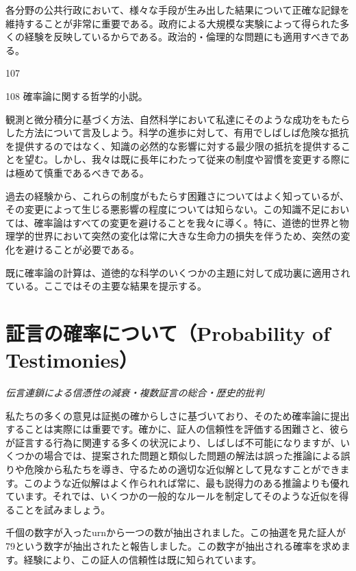 \documentclass[a4paper,11pt,openany]{ltjsbook}
\begin{document}
各分野の公共行政において、様々な手段が生み出した結果について正確な記録を維持することが非常に重要である。政府による大規模な実験によって得られた多くの経験を反映しているからである。政治的・倫理的な問題にも適用すべきである。

107

108      確率論に関する哲学的小説。

観測と微分積分に基づく方法、自然科学において私達にそのような成功をもたらした方法について言及しよう。科学の進歩に対して、有用でしばしば危険な抵抗を提供するのではなく、知識の必然的な影響に対する最少限の抵抗を提供することを望む。しかし、我々は既に長年にわたって従来の制度や習慣を変更する際には極めて慎重であるべきである。

過去の経験から、これらの制度がもたらす困難さについてはよく知っているが、その変更によって生じる悪影響の程度については知らない。この知識不足においては、確率論はすべての変更を避けることを我々に導く。特に、道徳的世界と物理学的世界において突然の変化は常に大きな生命力の損失を伴うため、突然の変化を避けることが必要である。

既に確率論の計算は、道徳的な科学のいくつかの主題に対して成功裏に適用されている。ここではその主要な結果を提示する。

\newpage

\chapter{証言の確率について（Probability of Testimonies）}
\label{ch:xi}

\begin{center}
\large\textit{伝言連鎖による信憑性の減衰・複数証言の総合・歴史的批判}
\end{center}
\vspace{4mm}

私たちの多くの意見は証拠の確からしさに基づいており、そのため確率論に提出することは実際には重要です。確かに、証人の信頼性を評価する困難さと、彼らが証言する行為に関連する多くの状況により、しばしば不可能になりますが、いくつかの場合では、提案された問題と類似した問題の解法は誤った推論による誤りや危険から私たちを導き、守るための適切な近似解として見なすことができます。このような近似解はよく作られれば常に、最も説得力のある推論よりも優れています。それでは、いくつかの一般的なルールを制定してそのような近似を得ることを試みましょう。

千個の数字が入ったurnから一つの数が抽出されました。この抽選を見た証人が79という数字が抽出されたと報告しました。この数字が抽出される確率を求めます。経験により、この証人の信頼性は既に知られています。
\end{document}
